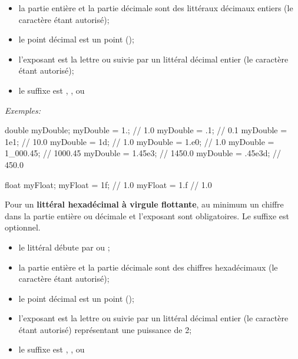 \begin{itemize}

	\item la partie entière et la partie décimale sont des littéraux décimaux
		entiers (le caractère \pc{\_} étant autorisé);

	\item le point décimal est un point ();

	\item l'exposant est la lettre  ou  suivie par un littéral
		décimal entier (le caractère \pc{\_} étant autorisé);

	\item le suffixe est , ,  ou 

\end{itemize}

\textit{Exemples:}
\begin{java}
	double myDouble;
	myDouble = 1.;			// 1.0
	myDouble = .1;			// 0.1
	myDouble = 1e1;			// 10.0
	myDouble = 1d;			// 1.0
	myDouble = 1.e0;		// 1.0
	myDouble = 1_000.45;	// 1000.45
	myDouble = 1.45e3;		// 1450.0
	myDouble = .45e3d;		// 450.0
	
	float myFloat;
	myFloat = 1f;			// 1.0
	myFloat = 1.f			// 1.0	
\end{java}

Pour un \textbf{littéral hexadécimal à virgule flottante}, au minimum un
chiffre dans la partie entière ou décimale et l'exposant sont obligatoires. Le
suffixe est optionnel. 

\begin{itemize}

	\item le littéral débute par  ou ;

	\item la partie entière et la partie décimale sont des chiffres hexadécimaux
		(le caractère \pc{\_} étant autorisé);

	\item le point décimal est un point ();

	\item l'exposant est la lettre  ou  suivie par un littéral
		décimal entier (le caractère \pc{\_} étant autorisé) représentant une 
		puissance de 2;

	\item le suffixe est , ,  ou 

\end{itemize}

